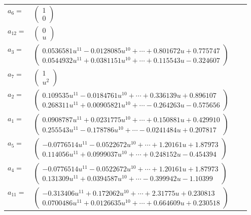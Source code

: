 \documentclass[1p]{elsarticle_modified}
\theoremstyle{definition}
\begin{document}
\begin{tabular}{m{7pt} m{180pt} m{7pt} m{180pt} }
\flushright $a_{6}=$&$\begin{pmatrix}1\\0\end{pmatrix}$ \\
\flushright $a_{12}=$&$\begin{pmatrix}0\\u\end{pmatrix}$ \\
\flushright $a_{3}=$&$\begin{pmatrix}0.0536581 u^{11}-0.0128085 u^{10}+\cdots+0.801672 u+0.775747\\0.0544932 u^{11}+0.0381151 u^{10}+\cdots+0.115543 u-0.324607\end{pmatrix}$ \\
\flushright $a_{7}=$&$\begin{pmatrix}1\\u^2\end{pmatrix}$ \\
\flushright $a_{2}=$&$\begin{pmatrix}0.109535 u^{11}-0.0184761 u^{10}+\cdots+0.336139 u+0.896107\\0.268311 u^{11}+0.00905821 u^{10}+\cdots-0.264263 u-0.575656\end{pmatrix}$ \\
\flushright $a_{1}=$&$\begin{pmatrix}0.0908787 u^{11}+0.0231775 u^{10}+\cdots+0.150881 u+0.429910\\0.255543 u^{11}-0.178786 u^{10}+\cdots-0.0241484 u+0.207817\end{pmatrix}$ \\
\flushright $a_{5}=$&$\begin{pmatrix}-0.0776514 u^{11}-0.0522672 u^{10}+\cdots+1.20161 u+1.87973\\0.114056 u^{11}+0.0999037 u^{10}+\cdots+0.248152 u-0.454394\end{pmatrix}$ \\
\flushright $a_{4}=$&$\begin{pmatrix}-0.0776514 u^{11}-0.0522672 u^{10}+\cdots+1.20161 u+1.87973\\0.131309 u^{11}+0.0394587 u^{10}+\cdots-0.399942 u-1.10399\end{pmatrix}$ \\
\flushright $a_{11}=$&$\begin{pmatrix}-0.313406 u^{11}+0.172062 u^{10}+\cdots+2.31775 u+0.230813\\0.0700486 u^{11}+0.0126635 u^{10}+\cdots+0.664609 u+0.230518\end{pmatrix}$ \\

\end{tabular}
\end{document}
